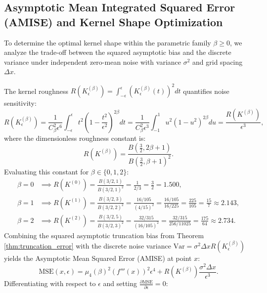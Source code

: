 \documentclass[11pt,a4paper]{article}
\theoremstyle{definition}
\begin{document}
\subsection{Asymptotic Mean Integrated Squared Error (AMISE) and Kernel Shape Optimization}
\label{sec:amise_efficiency}
To determine the optimal kernel shape within the parametric family $\beta \ge 0$, we analyze the trade-off between the squared asymptotic bias and the discrete variance under independent zero-mean noise with variance $\sigma^2$ and grid spacing $\Delta x$.

The kernel roughness $R(K_\epsilon^{(\beta)}) = \int_{-\epsilon}^\epsilon (K_\epsilon^{(\beta)}(t))^2 dt$ quantifies noise sensitivity:
\begin{equation}
R(K_\epsilon^{(\beta)}) = \frac{1}{C_\beta^2 \epsilon^6} \int_{-\epsilon}^\epsilon t^2 \left(1 - \frac{t^2}{\epsilon^2}\right)^{2\beta} dt = \frac{1}{C_\beta^2 \epsilon^3} \int_{-1}^1 u^2 (1 - u^2)^{2\beta} du = \frac{R(K^{(\beta)})}{\epsilon^3},
\end{equation}
where the dimensionless roughness constant is:
\begin{equation}
R(K^{(\beta)}) = \frac{B\left(\frac{3}{2}, 2\beta + 1\right)}{B\left(\frac{3}{2}, \beta + 1\right)^2}.
\end{equation}
Evaluating this constant for $\beta \in \{0, 1, 2\}$:
\begin{align}
\beta = 0 &\implies R(K^{(0)}) = \frac{B(3/2, 1)}{B(3/2, 1)^2} = \frac{1}{2/3} = \frac{3}{2} = 1.500, \\
\beta = 1 &\implies R(K^{(1)}) = \frac{B(3/2, 3)}{B(3/2, 2)^2} = \frac{16/105}{(4/15)^2} = \frac{16/105}{16/225} = \frac{225}{105} = \frac{15}{7} \approx 2.143, \\
\beta = 2 &\implies R(K^{(2)}) = \frac{B(3/2, 5)}{B(3/2, 3)^2} = \frac{32/315}{(16/105)^2} = \frac{32/315}{256/11025} = \frac{175}{64} \approx 2.734.
\end{align}
Combining the squared asymptotic truncation bias from Theorem \ref{thm:truncation_error} with the discrete noise variance $\text{Var} = \sigma^2 \Delta x R(K_\epsilon^{(\beta)})$ yields the Asymptotic Mean Squared Error (AMISE) at point $x$:
\begin{equation}
\text{MSE}(x, \epsilon) = \mu_4(\beta)^2 (f'''(x))^2 \epsilon^4 + R(K^{(\beta)}) \frac{\sigma^2 \Delta x}{\epsilon^3}.
\label{eq:amise_objective}
\end{equation}
Differentiating with respect to $\epsilon$ and setting $\frac{\partial \text{MSE}}{\partial \epsilon} = 0$:
\end{document}
